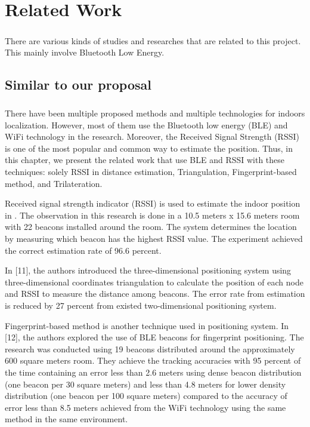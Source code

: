 \chapter{Related Work}
\paragraph{}There are various kinds of studies and researches that are related to this project. This mainly involve Bluetooth Low Energy.

\section{Similar to our proposal}
\paragraph{} There have been multiple proposed methods and multiple technologies for indoors localization. However, most of them use the Bluetooth low energy (BLE) and WiFi technology in the research. Moreover, the Received Signal Strength (RSSI) is one of the most popular and common way to estimate the position. Thus, in this chapter, we present the related work that use BLE and RSSI with these techniques: solely RSSI in distance estimation, Triangulation, Fingerprint-based method, and Trilateration.


Received signal strength indicator (RSSI) is used to estimate the indoor position in \cite{ref:r10}. The observation in this research is done in a 10.5 meters x 15.6 meters room with 22 beacons installed around the room. The system determines the location by measuring which beacon has the highest RSSI value. The experiment achieved the correct estimation rate of 96.6 percent.

In [11], the authors introduced the three-dimensional positioning system using three-dimensional coordinates triangulation to calculate the position of each node and RSSI to measure the distance among beacons. The error rate from estimation is reduced by 27 percent from existed two-dimensional positioning system. 

Fingerprint-based method is another technique used in positioning system. In [12], the authors explored the use of BLE beacons for fingerprint positioning. The research was conducted using 19 beacons distributed around the approximately 600 square meters room. They achieve the tracking accuracies with 95 percent of the time containing an error less than 2.6 meters using dense beacon distribution (one beacon per 30 square meters) and less than 4.8 meters for lower density distribution (one beacon per 100 square meters) compared to the accuracy of error less than 8.5 meters achieved from the WiFi technology using the same method in the same environment.

